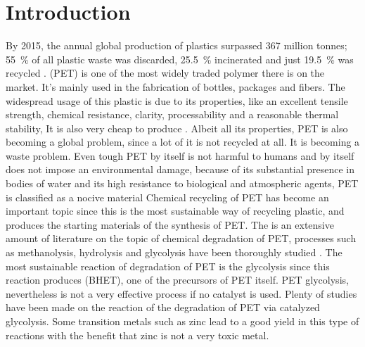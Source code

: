 \section{Introduction}

By 2015, the annual global production of plastics surpassed 367 million tonnes; \SI{55}{\percent} of all plastic waste was discarded, \SI{25.5}{\percent} incinerated and just \SI{19.5}{\percent} was recycled \cite{Geyer2017}.  (PET) is one of the most widely traded polymer there is on the market. It's mainly used in the fabrication of bottles, packages and fibers. The widespread usage of this plastic is due to its properties, like an excellent tensile strength, chemical resistance, clarity, processability and a reasonable thermal stability, It is also very cheap to produce \cite{Caldicott1999,Thompson2009}. Albeit all its properties, PET is also becoming a global problem, since a lot of it is not recycled at all. It is becoming a waste problem. Even tough PET by itself is not harmful to humans and by itself does not impose an environmental damage, because of its substantial presence in bodies of water and its high resistance to biological and atmospheric agents, PET is classified as a nocive material \cite{Paszun1997}
Chemical recycling of PET has become an important topic since this is the most sustainable way of recycling plastic, and produces  the starting materials of the synthesis of PET. The is an extensive amount of literature on the topic of chemical degradation of PET, processes such as methanolysis, hydrolysis and glycolysis have been thoroughly  studied \cite{Campanelli1993,Campanelli1994,Campanelli1994a}. The most sustainable reaction of degradation of PET is the glycolysis since this reaction produces  (BHET), one of the precursors of PET itself. PET glycolysis, nevertheless is not a very effective process if no catalyst is used. Plenty of studies have been made on the reaction of the degradation of PET via catalyzed glycolysis. Some transition metals such as zinc lead to a good yield in this type of reactions with the benefit that zinc is not a very toxic metal.
